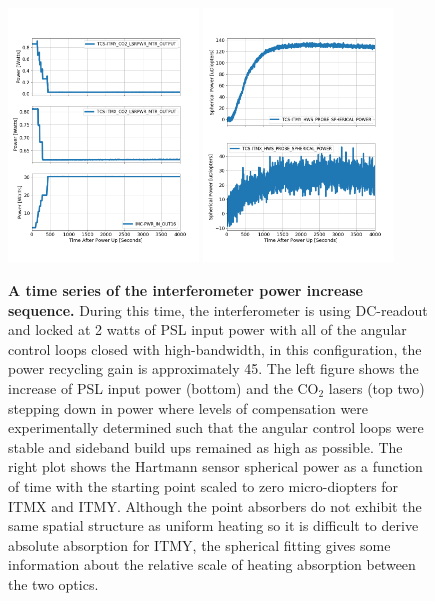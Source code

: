 	\begin{figure}[t!]
		\centering
		\includegraphics[width=0.45\textwidth]{../Figures/1231726400TCS_and_PSL_powerup.png}
		\includegraphics[width=0.45\textwidth]{../Figures/1231726400HWS_powerup.png}
		\caption[A time series of the interferometer power increase sequence.] 
		{\textbf{A time series of the interferometer power increase sequence.} 
			During this time, the interferometer is using DC-readout and locked at 2 watts of PSL input power with all of the angular control loops closed with high-bandwidth, in this configuration, the power recycling gain is approximately 45.  The left figure shows the increase of PSL input power (bottom) and the CO$_2$ lasers (top two) stepping down in power where levels of compensation were experimentally determined such that the angular control loops were stable and sideband build ups remained as high as possible.  The right plot shows the Hartmann sensor spherical power as a function of time with the starting point scaled to zero micro-diopters for ITMX and ITMY.  Although the point absorbers do not exhibit the same spatial structure as uniform heating so it is difficult to derive absolute absorption for ITMY, the spherical fitting gives some information about the relative scale of heating absorption between the two optics.}
		\label{fig:pwr_up_time}
	\end{figure}
	

